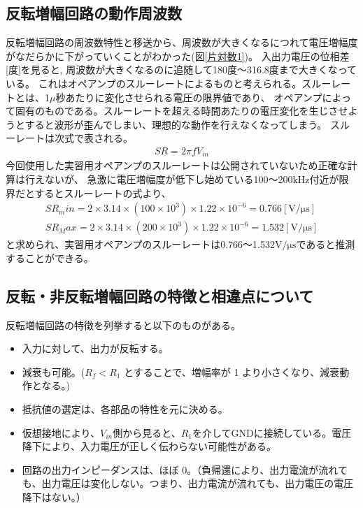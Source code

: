 \documentclass[a4paper,11pt,uplatex]{jsarticle}
\begin{document}
\subsection{反転増幅回路の動作周波数}
反転増幅回路の周波数特性と移送から、周波数が大きくなるにつれて電圧増幅度がなだらかに下がっていくことがわかった(図\ref{片対数1})。
入出力電圧の位相差[度]を見ると, 周波数が大きくなるのに追随して180度〜316.8度まで大きくなっている。
これはオペアンプのスルーレートによるものと考えられる。スルーレートとは、1$\mu$秒あたりに変化させられる電圧の限界値であり、
オペアンプによって固有のものである。スルーレートを超える時間あたりの電圧変化を生じさせようとすると波形が歪んでしまい、理想的な動作を行えなくなってしまう。
スルーレートは次式で表される。
\begin{align}
	SR = 2 \pi f V_{in}
\end{align}
今回使用した実習用オペアンプのスルーレートは公開されていないため正確な計算は行えないが、
急激に電圧増幅度が低下し始めている100〜200kHz付近が限界だとするとスルーレートの式より、
\begin{align}
	SR_min = 2 \times 3.14 \times (100 \times 10^3) \times 1.22 \times 10^{-6}= 0.766 [\mathrm{V/\mu s}] \\
	SR_Max = 2 \times 3.14 \times (200 \times 10^3) \times 1.22 \times 10^{-6}= 1.532 [\mathrm{V/\mu s}]
\end{align}
と求められ、実習用オペアンプのスルーレートは0.766〜1.532$\mathrm{V/\mu s}$であると推測することができる。
\subsection{反転・非反転増幅回路の特徴と相違点について}
反転増幅回路の特徴を列挙すると以下のものがある。
\begin{itemize}
	\item 入力に対して、出力が反転する。
	\item 減衰も可能。($R_f < R_1$ とすることで、増幅率が 1 より小さくなり、減衰動作となる。)
	\item 抵抗値の選定は、各部品の特性を元に決める。
  \item 仮想接地により、$V_{in}$側から見ると、$R_1$を介してGNDに接続している。電圧降下により、入力電圧が正しく伝わらない可能性がある。
	\item 回路の出力インピーダンスは、ほぼ 0。（負帰還により、出力電流が流れても、出力電圧は変化しない。つまり、出力電流が流れても、出力電圧の電圧降下はない。）
\end{itemize}
\end{document}
